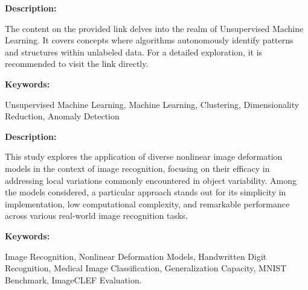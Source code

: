 
{ 
	
	\textbf{Description:}
	
	The content on the provided link delves into the realm of Unsupervised Machine Learning. It covers concepts where algorithms autonomously identify patterns and structures within unlabeled data. For a detailed exploration, it is recommended to visit the link directly.\autocite{JavaTPoint:2021}

	
	\textbf{Keywords:} 
	
	Unsupervised Machine Learning, Machine Learning, Clustering, Dimensionality Reduction, Anomaly Detection

	
	
}




{ 
	
	\textbf{Description:}
	
	This study explores the application of diverse nonlinear image deformation models in the context of image recognition, focusing on their efficacy in addressing local variations commonly encountered in object variability. Among the models considered, a particular approach stands out for its simplicity in implementation, low computational complexity, and remarkable performance across various real-world image recognition tasks.\autocite{Keysers:2007}

	
	
	\textbf{Keywords:} 
	
	Image Recognition, Nonlinear Deformation Models, Handwritten Digit Recognition, Medical Image Classification, Generalization Capacity, MNIST Benchmark, ImageCLEF Evaluation.

	
}





